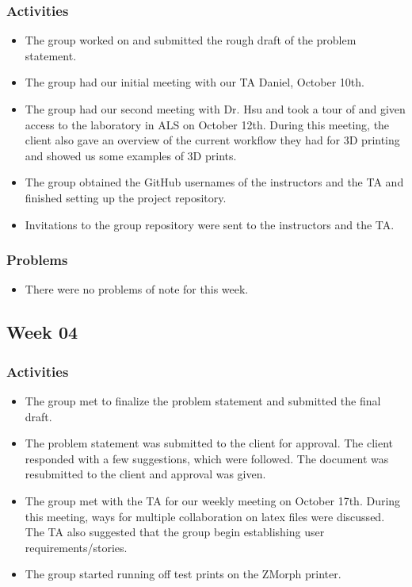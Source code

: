 \documentclass[letterpaper, onecolumn, draftclsnofoot, 10pt, compsoc]{IEEEtran}
\begin{document}
\begin{singlespace}
    	\subsubsection{Activities}
        	\begin{itemize}
        	\item The group worked on and submitted the rough draft of the problem statement.
             \item The group had our initial meeting with our TA Daniel, October 10th.
            \item The group had our second meeting with Dr. Hsu and took a tour of and given access to the laboratory in ALS on October 12th. During this meeting, the client also gave an overview of the current workflow they had for 3D printing and showed us some examples of 3D prints.
            \item The group obtained the GitHub usernames of the instructors and the TA and finished setting up the project repository.
            \item Invitations to the group repository were sent to the instructors and the TA.
        	\end{itemize}
        \subsubsection{Problems}
        	\begin{itemize}
        	\item There were no problems of note for this week.
        	\end{itemize}
        
    \subsection{Week 04}
    	\subsubsection{Activities}
        	\begin{itemize}
        	\item The group met to finalize the problem statement and submitted the final draft.
            \item The problem statement was submitted to the client for approval. The client responded with a few suggestions, which were followed. The document was resubmitted to the client and approval was given.
            \item The group met with the TA for our weekly meeting on October 17th. During this meeting, ways for multiple collaboration on latex files were discussed. The TA also suggested that the group begin establishing user requirements/stories.
            \item The group started running off test prints on the ZMorph printer.
        	\end{itemize}

\end{singlespace}
\end{document}
